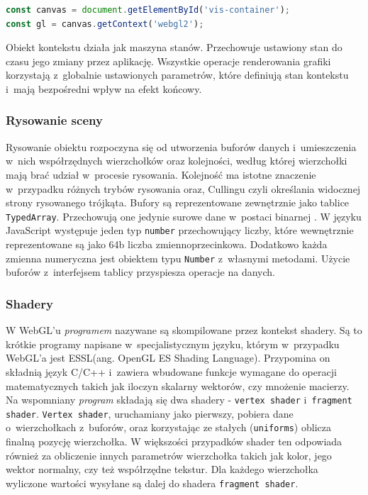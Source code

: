 \begin{lstlisting}[language=javascript, label={lst:webglContext}, caption={Pobranie kontekstu API WebGL do zmiennej}]
const canvas = document.getElementById('vis-container');
const gl = canvas.getContext('webgl2');
\end{lstlisting}

Obiekt kontekstu działa jak maszyna stanów. Przechowuje ustawiony stan do czasu jego zmiany przez aplikację. Wszystkie operacje renderowania grafiki korzystają z~globalnie ustawionych parametrów, które definiują stan kontekstu i~mają bezpośredni wpływ na efekt końcowy\cite[Rozdział 1]{RealTime3DGraphics}.

\subsubsection{Rysowanie sceny}

Rysowanie obiektu rozpoczyna się od utworzenia buforów danych i~umieszczenia w~nich współrzędnych wierzchołków oraz kolejności, według której wierzchołki mają brać udział w~procesie rysowania. Kolejność ma istotne znaczenie w~przypadku różnych trybów rysowania oraz, Cullingu czyli określania widocznej strony rysowanego trójkąta. Bufory są reprezentowane zewnętrznie jako tablice \texttt{TypedArray}. Przechowują one jedynie surowe dane w~postaci binarnej \cite{TypedArrays}. W języku JavaScript występuje jeden typ \texttt{number} przechowujący liczby, które wewnętrznie reprezentowane są jako 64b liczba zmiennoprzecinkowa. Dodatkowo każda zmienna numeryczna jest obiektem typu \texttt{Number} z~własnymi metodami. Użycie buforów z~interfejsem tablicy przyspiesza operacje na danych.

\subsubsection{Shadery}

W WebGL'u \textit{programem} nazywane są skompilowane przez kontekst shadery. Są to krótkie programy napisane w~specjalistycznym języku, którym w~przypadku WebGL'a jest ESSL(ang. OpenGL ES Shading Language). Przypomina on składnią język C/C++\cite{ESSL} i~zawiera wbudowane funkcje wymagane do operacji matematycznych takich jak iloczyn skalarny wektorów, czy mnożenie macierzy. Na wspomniany \textit{program} składają się dwa shadery - \texttt{vertex shader} i~\texttt{fragment shader}. \texttt{Vertex shader}, uruchamiany jako pierwszy, pobiera dane o~wierzchołkach z~buforów, oraz korzystając ze stałych (\texttt{uniforms}) oblicza finalną pozycję wierzchołka. W większości przypadków shader ten odpowiada również za obliczenie innych parametrów wierzchołka takich jak kolor, jego wektor normalny, czy też współrzędne tekstur. Dla każdego wierzchołka wyliczone wartości wysyłane są dalej do shadera \texttt{fragment shader}.

